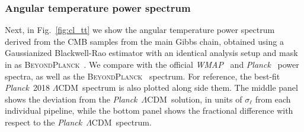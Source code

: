 \documentclass[twocolumn]{../../common/aa}
\def\WMAP{\emph{WMAP}}
\def\planck{\emph{Planck}}
\def\LCDM{$\Lambda$CDM}
\newcommand{\bp}{\textsc{BeyondPlanck}}
\newcommand{\cosmoglobe}{\textsc{Cosmoglobe}}
\newcommand{\K}[0]{\textit K}
\begin{document}

\subsubsection{Angular temperature power spectrum}
\label{sec:cls}



Next, in Fig.~\ref{fig:cl_tt} we show the angular temperature power spectrum derived from the CMB samples from the main Gibbs chain, obtained using a Gaussianized Blackwell-Rao estimator \citep{chu2005,rudjord:2009} with an identical analysis setup and mask in as \bp\ \citep{bp11}. We compare with the official \WMAP\ \citep{hinshaw2012} and \planck\ \citep{planck2016-l05} power spectra, as well as the \bp\ \citep{bp11} spectrum. For reference, the best-fit \planck\ 2018 \LCDM\ spectrum is also plotted along side them. The middle panel shows the deviation from the \planck\ \LCDM\ solution, in units of $\sigma_\ell$ from each individual pipeline, while the bottom panel shows the fractional difference with respect to the \planck\ \LCDM\ spectrum. 
\end{document}
